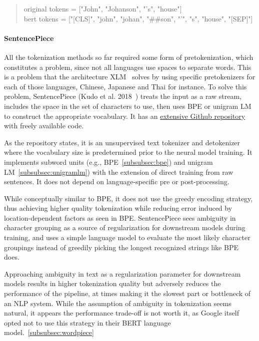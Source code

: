 \begin{quote}
    original tokens = ["John", "Johanson", "'s",  "house"]\\
    bert tokens = ["[CLS]", "john", "johan", "\#\#son", "'", "s", "house", "[SEP]"]
\end{quote}

\paragraph{SentencePiece}

All the tokenization methods so far required some form of pretokenization, which constitutes a problem, since not all languages use spaces to separate words. This is a problem that the architecture XLM~\cite{lample2019crosslingual} solves by using specific pretokenizers for each of those languages, Chinese, Japanese and Thai for instance. To solve this problem, SentencePiece (Kudo et al. 2018~\cite{kudo2018sentencepiece}) treats the input as a raw stream, includes the space in the set of characters to use, then uses BPE or unigram LM to construct the appropriate vocabulary. It has an \href{https://github.com/google/sentencepiece}{extensive Github repository} with freely available code.

As the repository states, it is an unsupervised text tokenizer and detokenizer where the vocabulary size is predetermined prior to the neural model training. It implements subword units (e.g., BPE~\ref{subsubsec:bpe}) and unigram LM~\ref{subsubsec:unigramlm}) with the extension of direct training from raw sentences. It does not depend on language-specific pre or post-processing.

While conceptually similar to BPE, it does not use the greedy encoding strategy, thus achieving higher quality tokenization while reducing error induced by location-dependent factors as seen in BPE. SentencePiece sees ambiguity in character grouping as a source of regularization for downstream models during training, and uses a simple language model to evaluate the most likely character groupings instead of greedily picking the longest recognized strings like BPE does.

Approaching ambiguity in text as a regularization parameter for downstream models results in higher tokenization quality but adversely reduces the performance of the pipeline, at times making it the slowest part or bottleneck of an NLP system. While the assumption of ambiguity in tokenization seems natural, it appears the performance trade-off is not worth it, as Google itself opted not to use this strategy in their BERT language model.~\ref{subsubsec:wordpiece}

